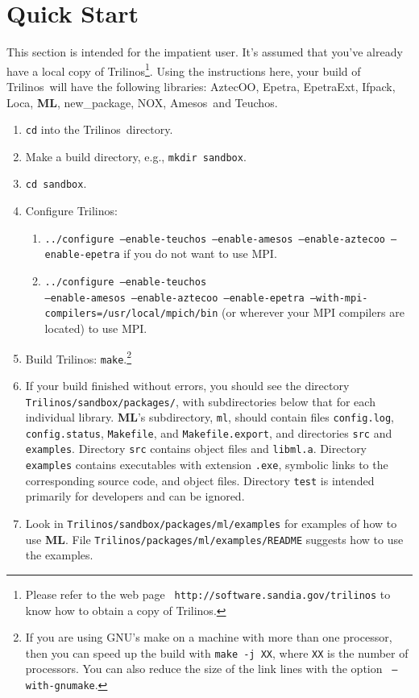 \documentclass{article}[11pt]
\newcommand{\Aztecoo}  {{\sc AztecOO}}
\newcommand{\aztecoo}  {{\Aztecoo}}
\newcommand{\epetra}  {{\sc Epetra}}
\newcommand{\epetraext}  {{\sc EpetraExt}}
\newcommand{\ML}     {{\bf ML}}
\newcommand{\trilinos}  {{\sc Trilinos}}
\newcommand{\amesos}  {{\sc Amesos}}
\newcommand{\ifpack}  {{\sc Ifpack}}
\newcommand{\teuchos}  {{\sc Teuchos}}
\newcommand{\newpackage}  {{\sc new\_package}}
\newcommand{\nox}  {{\sc NOX}}
\newcommand{\loca}  {{\sc Loca}}
\newcommand{\be}  {\begin{enumerate}}
\newcommand{\ee}  {\end{enumerate}}
\begin{document}
\section{Quick Start}
\label{quick start}
%
This section is intended for the impatient user.
It's assumed that you've already have a local copy of
\trilinos\footnote{Please refer to the web page {\tt
  http://software.sandia.gov/trilinos} to know how to obtain a copy of
    \trilinos.}.
Using the instructions here, your build of \trilinos~will have the following
libraries: \aztecoo, \epetra, \epetraext, \ifpack, \loca, \ML, \newpackage,
\nox, \amesos~and \teuchos.
\be
\item \verb!cd! into the \trilinos~directory.
\item Make a build directory, e.g., \verb!mkdir sandbox!.
\item \verb!cd sandbox!.
\item Configure \trilinos:
  \be
  \item   {\tt ../configure --enable-teuchos --enable-amesos --enable-aztecoo
--enable-epetra}
 if you do not want to use MPI.
  \item   {\tt ../configure  --enable-teuchos \\
  --enable-amesos --enable-aztecoo --enable-epetra --with-mpi-compilers=/usr/local/mpich/bin} (or wherever your MPI compilers are
located) to use MPI.
  \ee
\item Build \trilinos: \verb!make!.\footnote{If you are using GNU's make on a
machine with more than one processor, then you can speed up the
build with {\tt make -j XX}, where {\tt XX} is the number of processors.  You
can also reduce the size of the link lines with the option {\tt
--with-gnumake}.}
\item If your build finished without errors, you should see the directory\\
\verb!Trilinos/sandbox/packages/!, with subdirectories below that for
each individual library.   \ML's subdirectory, \verb!ml!, should contain
files \verb!config.log!, \verb!config.status!, \verb!Makefile!, and
\verb!Makefile.export!, and directories \verb!src! and \verb!examples!.
Directory \verb!src! contains object files and \verb!libml.a!.
Directory \verb!examples! contains executables with extension \verb!.exe!,
symbolic links to the corresponding source code, and object files.
Directory \verb!test! is intended primarily for developers and can be ignored.
\item Look in \verb!Trilinos/sandbox/packages/ml/examples! for examples of how
to use \ML. File \verb!Trilinos/packages/ml/examples/README! suggests how to
use the examples.
\ee
%
%
\end{document}
